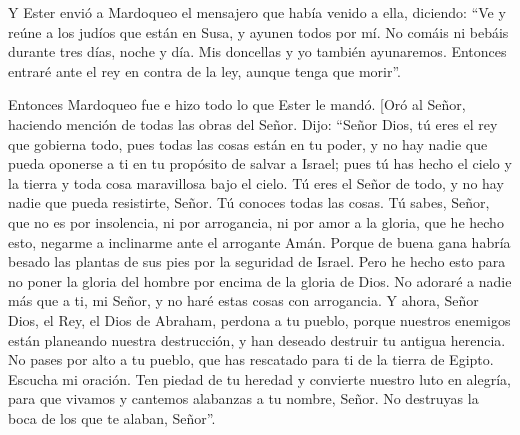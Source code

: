  Y Ester envió a Mardoqueo el mensajero que había venido
a ella, diciendo:  ``Ve y reúne a los judíos que están en
Susa, y ayunen todos por mí. No comáis ni bebáis durante tres días,
noche y día. Mis doncellas y yo también ayunaremos. Entonces entraré
ante el rey en contra de la ley, aunque tenga que morir''.

 Entonces Mardoqueo fue e hizo todo lo que Ester le
mandó.  {[}Oró al Señor, haciendo mención de todas las
obras del Señor.  Dijo: ``Señor Dios, tú eres el rey que
gobierna todo, pues todas las cosas están en tu poder, y no hay nadie
que pueda oponerse a ti en tu propósito de salvar a Israel;
 pues tú has hecho el cielo y la tierra y toda cosa
maravillosa bajo el cielo.  Tú eres el Señor de todo, y
no hay nadie que pueda resistirte, Señor.  Tú conoces
todas las cosas. Tú sabes, Señor, que no es por insolencia, ni por
arrogancia, ni por amor a la gloria, que he hecho esto, negarme a
inclinarme ante el arrogante Amán.  Porque de buena gana
habría besado las plantas de sus pies por la seguridad de Israel.
 Pero he hecho esto para no poner la gloria del hombre
por encima de la gloria de Dios. No adoraré a nadie más que a ti, mi
Señor, y no haré estas cosas con arrogancia.  Y ahora,
Señor Dios, el Rey, el Dios de Abraham, perdona a tu pueblo, porque
nuestros enemigos están planeando nuestra destrucción, y han deseado
destruir tu antigua herencia.  No pases por alto a tu
pueblo, que has rescatado para ti de la tierra de Egipto.
 Escucha mi oración. Ten piedad de tu heredad y convierte
nuestro luto en alegría, para que vivamos y cantemos alabanzas a tu
nombre, Señor. No destruyas la boca de los que te alaban, Señor''.

